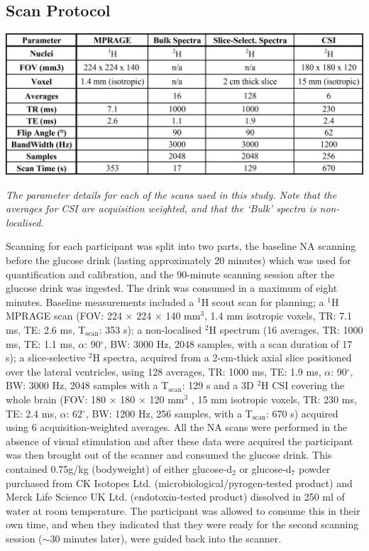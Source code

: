 \subsection{Scan Protocol}

\begin{table}
    \centering
    \includegraphics[width = 1\textwidth]{Figures/Glucose/Scan_Details.png}
    \caption{\textit{The parameter details for each of the scans used in this study. Note that the averages for CSI are acquisition weighted, and that the `Bulk' spectra is non-localised.}}
    \label{fig:Glu:Scan_Details}
\end{table}

Scanning for each participant was split into two parts, the baseline \ac{NA} scanning before the glucose drink (lasting approximately 20 minutes) which was used for quantification and calibration, and the 90-minute scanning session after the glucose drink was ingested. The drink was consumed in a maximum of eight minutes. Baseline measurements included a $^1$H scout scan for planning; a $^1$H \ac{MPRAGE} scan (\ac{FOV}: 224 $\times$ 224 $\times$ 140 mm$^3$, 1.4 mm isotropic voxels, \ac{TR}: 7.1 ms, \ac{TE}: 2.6 ms, T$_\text{scan}$: 353 s); a non-localised $^2$H spectrum (16 averages, \ac{TR}: 1000 ms, \ac{TE}: 1.1 ms, $\alpha$: 90$^\circ$, \ac{BW}: 3000 Hz, 2048 samples, with a scan duration of 17 s); a slice-selective $^2$H spectra, acquired from a 2-cm-thick axial slice positioned over the lateral ventricles, using 128 averages, TR: 1000 ms, TE: 1.9 ms, $\alpha$: 90$^\circ$, \ac{BW}: 3000 Hz,  2048 samples with a T$_\text{scan}$: 129 s and a 3D $^2$H \ac{CSI} covering the whole brain (\ac{FOV}: 180 $\times$ 180 $\times$ 120 mm$^3$ , 15 mm isotropic voxels, \ac{TR}: 230 ms, \ac{TE}: 2.4 ms, $\alpha$: 62$^\circ$, \ac{BW}: 1200 Hz, 256 samples, with a T$_\text{scan}$: 670 s) acquired using 6 acquisition-weighted \cite{Pohmann2001AccurateCSI} averages. All the \ac{NA} scans were performed in the absence of visual stimulation and after these data were acquired the participant was then brought out of the scanner and consumed the glucose drink. This contained 0.75g/kg (bodyweight) of either glucose-d$_2$ or glucose-d$_7$ powder purchased from CK Isotopes Ltd. (microbiological/pyrogen-tested product) and Merck Life Science UK Ltd. (endotoxin-tested product) dissolved in 250 ml of water at room temperature. The participant was allowed to consume this in their own time, and when they indicated that they were ready for the second scanning session ($\sim$30 minutes later), were guided back into the scanner.

